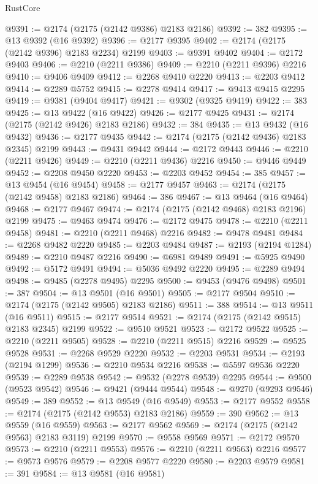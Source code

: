 \begin{lexlean}{RustCore}
\begin{coremodule}
@9391 := @2174 (@2175 (@2142 @9386) @2183 @2186)
@9392 := 382
@9395 := @13 @9392 (@16 @9392)
@9396 := @2177 @9395
@9402 := @2174 (@2175 (@2142 @9396) @2183 @2234) @2199
@9403 := @9391 @9402
@9404 := @2172 @9403
@9406 := @2210 (@2211 @9386)
@9409 := @2210 (@2211 @9396) @2216
@9410 := @9406 @9409
@9412 := @2268 @9410 @2220
@9413 := @2203 @9412
@9414 := @2289 @5752
@9415 := @2278 @9414
@9417 := @9413 @9415 @2295
@9419 := @9381 (@9404 @9417)
@9421 := @9302 (@9325 @9419)
@9422 := 383
@9425 := @13 @9422 (@16 @9422)
@9426 := @2177 @9425
@9431 := @2174 (@2175 (@2142 @9426) @2183 @2186)
@9432 := 384
@9435 := @13 @9432 (@16 @9432)
@9436 := @2177 @9435
@9442 := @2174 (@2175 (@2142 @9436) @2183 @2345) @2199
@9443 := @9431 @9442
@9444 := @2172 @9443
@9446 := @2210 (@2211 @9426)
@9449 := @2210 (@2211 @9436) @2216
@9450 := @9446 @9449
@9452 := @2208 @9450 @2220
@9453 := @2203 @9452
@9454 := 385
@9457 := @13 @9454 (@16 @9454)
@9458 := @2177 @9457
@9463 := @2174 (@2175 (@2142 @9458) @2183 @2186)
@9464 := 386
@9467 := @13 @9464 (@16 @9464)
@9468 := @2177 @9467
@9474 := @2174 (@2175 (@2142 @9468) @2183 @2196) @2199
@9475 := @9463 @9474
@9476 := @2172 @9475
@9478 := @2210 (@2211 @9458)
@9481 := @2210 (@2211 @9468) @2216
@9482 := @9478 @9481
@9484 := @2268 @9482 @2220
@9485 := @2203 @9484
@9487 := @2193 (@2194 @1284)
@9489 := @2210 @9487 @2216
@9490 := @6981 @9489
@9491 := @5925 @9490
@9492 := @5172 @9491
@9494 := @5036 @9492 @2220
@9495 := @2289 @9494
@9498 := @9485 (@2278 @9495) @2295
@9500 := @9453 (@9476 @9498)
@9501 := 387
@9504 := @13 @9501 (@16 @9501)
@9505 := @2177 @9504
@9510 := @2174 (@2175 (@2142 @9505) @2183 @2186)
@9511 := 388
@9514 := @13 @9511 (@16 @9511)
@9515 := @2177 @9514
@9521 := @2174 (@2175 (@2142 @9515) @2183 @2345) @2199
@9522 := @9510 @9521
@9523 := @2172 @9522
@9525 := @2210 (@2211 @9505)
@9528 := @2210 (@2211 @9515) @2216
@9529 := @9525 @9528
@9531 := @2268 @9529 @2220
@9532 := @2203 @9531
@9534 := @2193 (@2194 @1299)
@9536 := @2210 @9534 @2216
@9538 := @5597 @9536 @2220
@9539 := @2289 @9538
@9542 := @9532 (@2278 @9539) @2295
@9544 := @9500 (@9523 @9542)
@9546 := @9421 (@9444 @9544)
@9548 := @9270 (@9293 @9546)
@9549 := 389
@9552 := @13 @9549 (@16 @9549)
@9553 := @2177 @9552
@9558 := @2174 (@2175 (@2142 @9553) @2183 @2186)
@9559 := 390
@9562 := @13 @9559 (@16 @9559)
@9563 := @2177 @9562
@9569 := @2174 (@2175 (@2142 @9563) @2183 @3119) @2199
@9570 := @9558 @9569
@9571 := @2172 @9570
@9573 := @2210 (@2211 @9553)
@9576 := @2210 (@2211 @9563) @2216
@9577 := @9573 @9576
@9579 := @2208 @9577 @2220
@9580 := @2203 @9579
@9581 := 391
@9584 := @13 @9581 (@16 @9581)

\end{coremodule}
\end{lexlean}
